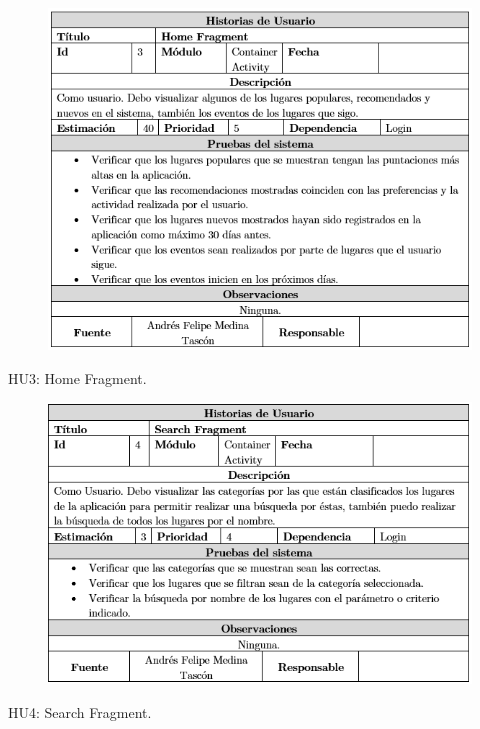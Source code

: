 \documentclass[12pt,letterpaper,openany]{book}
\begin{document}
\begin{table}[H]
\begin{center}
\begin{figure}[H]
\begin{center}
\includegraphics[width=13cm]{./imagenes/HU/HU3}
\end{center}
\end{figure}
\end{center}
\caption{HU3: Home Fragment.}
\end{table}

\begin{table}[H]
\begin{center}
\begin{figure}[H]
\begin{center}
\includegraphics[width=13cm]{./imagenes/HU/HU4}
\end{center}
\end{figure}
\end{center}
\caption{HU4: Search Fragment.}
\end{table}
\end{document}
